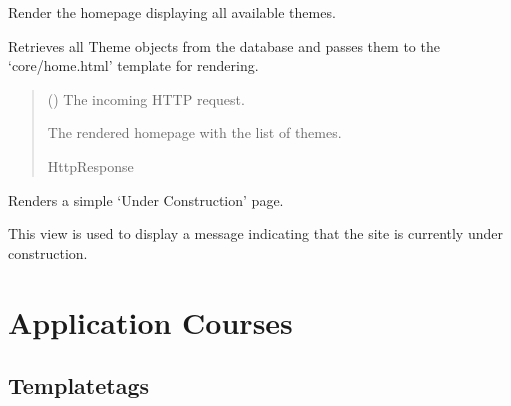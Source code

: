 \documentclass[letterpaper,10pt,english]{sphinxmanual}
\begin{document}
\begin{fulllineitems}
\label{\detokenize{core:core.views.home}}
\pysigstartsignatures
\pysiglinewithargsret
{}
{}
{}
\pysigstopsignatures
\sphinxAtStartPar
Render the homepage displaying all available themes.

\sphinxAtStartPar
Retrieves all Theme objects from the database and passes them
to the ‘core/home.html’ template for rendering.
\begin{quote}\begin{description}
\sphinxAtStartPar
{} () \textendash{} The incoming HTTP request.

\sphinxAtStartPar
The rendered homepage with the list of themes.

\sphinxAtStartPar
HttpResponse

\end{description}\end{quote}

\end{fulllineitems}


\begin{fulllineitems}
\label{\detokenize{core:core.views.under_construction}}
\pysigstartsignatures
\pysiglinewithargsret
{}
{}
{}
\pysigstopsignatures
\sphinxAtStartPar
Renders a simple ‘Under Construction’ page.

\sphinxAtStartPar
This view is used to display a message indicating that the site is currently under construction.

\end{fulllineitems}


\sphinxstepscope


\chapter{Application Courses}
\label{\detokenize{courses:application-courses}}\label{\detokenize{courses::doc}}

\section{Templatetags}
\label{\detokenize{courses:templatetags}}
\sphinxstepscope
\end{document}
